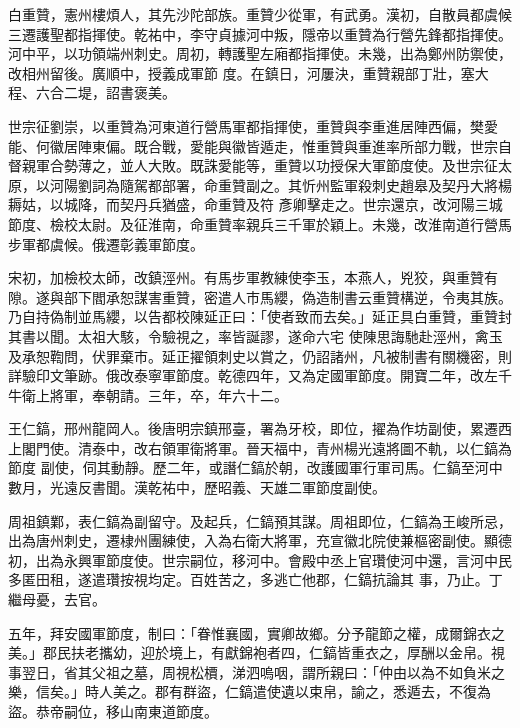 \begin{pinyinscope}
 白重贊，憲州樓煩人，其先沙陀部族。重贊少從軍，有武勇。漢初，自散員都虞候三遷護聖都指揮使。乾祐中，李守貞據河中叛，隱帝以重贊為行營先鋒都指揮使。河中平，以功領端州刺史。周初，轉護聖左廂都指揮使。未幾，出為鄭州防禦使，改相州留後。廣順中，授義成軍節
 度。在鎮日，河屢決，重贊親部丁壯，塞大程、六合二堤，詔書褒美。



 世宗征劉崇，以重贊為河東道行營馬軍都指揮使，重贊與李重進居陣西偏，樊愛能、何徽居陣東偏。既合戰，愛能與徽皆遁走，惟重贊與重進率所部力戰，世宗自督親軍合勢薄之，並人大敗。既誅愛能等，重贊以功授保大軍節度使。及世宗征太原，以河陽劉詞為隨駕都部署，命重贊副之。其忻州監軍殺刺史趙皋及契丹大將楊耨姑，以城降，而契丹兵猶盛，命重贊及符
 彥卿擊走之。世宗還京，改河陽三城節度、檢校太尉。及征淮南，命重贊率親兵三千軍於穎上。未幾，改淮南道行營馬步軍都虞候。俄遷彰義軍節度。



 宋初，加檢校太師，改鎮涇州。有馬步軍教練使李玉，本燕人，兇狡，與重贊有隙。遂與部下閻承恕謀害重贊，密遣人市馬纓，偽造制書云重贊構逆，令夷其族。乃自持偽制並馬纓，以告都校陳延正曰：「使者致而去矣。」延正具白重贊，重贊封其書以聞。太祖大駭，令驗視之，率皆誕謬，遂命六宅
 使陳思誨馳赴涇州，禽玉及承恕鞫問，伏罪棄市。延正擢領刺史以賞之，仍詔諸州，凡被制書有關機密，則詳驗印文筆跡。俄改泰寧軍節度。乾德四年，又為定國軍節度。開寶二年，改左千牛衛上將軍，奉朝請。三年，卒，年六十二。



 王仁鎬，邢州龍岡人。後唐明宗鎮邢臺，署為牙校，即位，擢為作坊副使，累遷西上閣門使。清泰中，改右領軍衛將軍。晉天福中，青州楊光遠將圖不軌，以仁鎬為節度
 副使，伺其動靜。歷二年，或譖仁鎬於朝，改護國軍行軍司馬。仁鎬至河中數月，光遠反書聞。漢乾祐中，歷昭義、天雄二軍節度副使。



 周祖鎮鄴，表仁鎬為副留守。及起兵，仁鎬預其謀。周祖即位，仁鎬為王峻所忌，出為唐州刺史，遷棣州團練使，入為右衛大將軍，充宣徽北院使兼樞密副使。顯德初，出為永興軍節度使。世宗嗣位，移河中。會殿中丞上官瓚使河中還，言河中民多匿田租，遂遣瓚按視均定。百姓苦之，多逃亡他郡，仁鎬抗論其
 事，乃止。丁繼母憂，去官。



 五年，拜安國軍節度，制曰：「眷惟襄國，實卿故鄉。分予龍節之權，成爾錦衣之美。」郡民扶老攜幼，迎於境上，有獻錦袍者四，仁鎬皆重衣之，厚酬以金帛。視事翌日，省其父祖之墓，周視松檟，涕泗嗚咽，謂所親曰：「仲由以為不如負米之樂，信矣。」時人美之。郡有群盜，仁鎬遣使遺以束帛，諭之，悉遁去，不復為盜。恭帝嗣位，移山南東道節度。




\end{pinyinscope}
